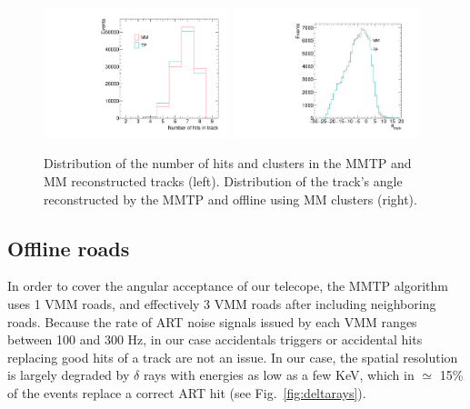 \begin{figure}[!htpb]
  \begin{center}
    \includegraphics[width=0.48\textwidth]{figures/tuna_analysis/trigger_nart.pdf}
    \includegraphics[width=0.48\textwidth]{figures/gbtanalysis3522/ang.pdf}
  \end{center}
  \vspace{-10pt}
  \caption{Distribution of the number of hits and clusters in the MMTP and MM reconstructed tracks (left). 
Distribution of the track's angle reconstructed by the MMTP
 and offline using MM clusters (right).}
  \label{fig:tp_vs_fe}
\end{figure}

\subsection{Offline roads}
\label{sec:perf-roads}

In order to cover the angular acceptance of our telecope, the MMTP algorithm uses 1 VMM  roads, and effectively
 3 VMM roads after including neighboring roads. 
Because the rate of ART noise signals issued by each VMM ranges between 100 and 300 Hz, in our case accidentals triggers or accidental hits replacing
good hits of a track are not an issue. In our case, the spatial resolution is largely degraded by $\delta$ rays
 with energies as low as a few KeV, which in $\simeq$ 15\% of the events replace a
correct  ART hit (see Fig.~\ref{fig:deltarays}).

